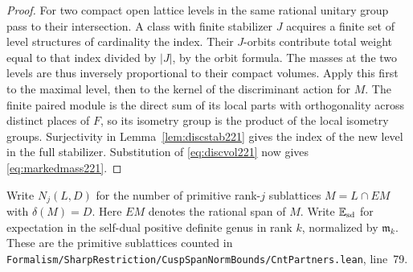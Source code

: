 \documentclass[a4paper,11pt]{article}
\theoremstyle{definition}
\theoremstyle{remark}
\newcommand{\srcloc}[2]{{\small\nolinkurl{#1.lean}}, line~#2}
\numberwithin{equation}{section}
\begin{document}
\begin{proof}
For two compact open lattice levels in the same rational
unitary group pass to their intersection. A class with finite
stabilizer \(J\) acquires a finite set of level structures of
cardinality the index. Their \(J\)-orbits contribute total
weight equal to that index divided by \(|J|\), by the orbit
formula. The masses at the two levels are thus inversely
proportional to their compact volumes. Apply this first to
the maximal level, then to the kernel of the discriminant
action for \(M\). The finite paired module is the direct sum
of its local parts with orthogonality across distinct
places of \(F\), so its isometry group is the product of the
local isometry groups. Surjectivity in
Lemma~\ref{lem:discstab221} gives the index of the new level
in the full stabilizer. Substitution of
\eqref{eq:discvol221} now gives \eqref{eq:markedmass221}.
\end{proof}

Write \(N_j(L,D)\) for the number of primitive rank-\(j\)
sublattices \(M=L\cap EM\) with \(\delta(M)=D\).
Here \(EM\) denotes the rational span of \(M\). Write
\(\mathbb E_{\rm sd}\) for expectation in the self-dual
positive definite genus in rank \(k\), normalized by
\(\mathfrak m_k\). These are the primitive sublattices counted
in \srcloc{Formalism/SharpRestriction/CuspSpanNormBounds/CntPartners}{79}.
\end{document}

